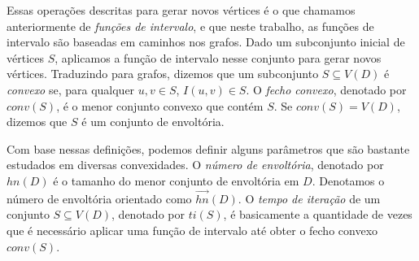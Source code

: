Essas operações descritas para gerar novos vértices é o que chamamos anteriormente de \emph{funções de intervalo}, e que neste trabalho, as funções de intervalo são baseadas em caminhos nos grafos. Dado um subconjunto inicial de vértices $S$, aplicamos a função de intervalo nesse conjunto para gerar novos vértices. Traduzindo para grafos, dizemos que um subconjunto $S \subseteq V(D)$ é \emph{convexo} se, para qualquer $u,v \in S$, $I(u,v) \in S$. O \emph{fecho convexo}, denotado por $conv(S)$, é o menor conjunto convexo que contém $S$. Se $conv(S) = V(D)$, dizemos que $S$ é um conjunto de envoltória.

Com base nessas definições, podemos definir alguns parâmetros que são bastante estudados em diversas convexidades. O \emph{número de envoltória}, denotado por $hn(D)$ é o tamanho do menor conjunto de envoltória em $D$. Denotamos o número de envoltória orientado como $\overrightarrow{hn}(D)$. O \emph{tempo de iteração} de um conjunto $S \subseteq V(D)$, denotado por $ti(S)$, é basicamente a quantidade de vezes que é necessário aplicar uma função de intervalo até obter o fecho convexo $conv(S)$.

